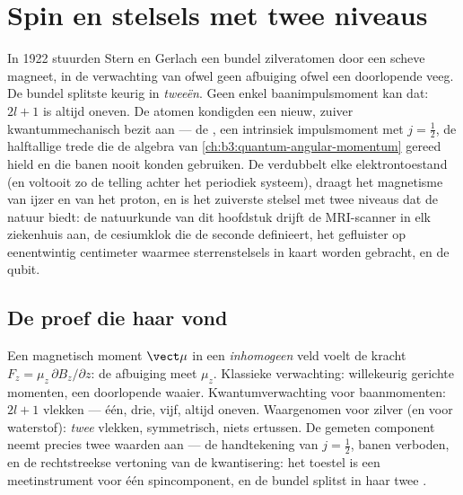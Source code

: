 \chapter{Spin en stelsels met twee niveaus}\label{ch:b3:spin-two-level}

In 1922 stuurden Stern en Gerlach een bundel zilveratomen door een
scheve magneet, in de verwachting van ofwel geen afbuiging ofwel een
doorlopende veeg. De bundel splitste keurig in \emph{tweeën}. Geen enkel
baanimpulsmoment kan dat: $2l + 1$ is altijd oneven. De atomen kondigden
een nieuw, zuiver kwantummechanisch bezit aan --- de \emph{}, een
intrinsiek impulsmoment met $j = \tfrac12$, de halftallige trede die de
algebra van \cref{ch:b3:quantum-angular-momentum} gereed hield en die
banen nooit konden gebruiken. De  verdubbelt elke elektrontoestand
(en voltooit zo de telling achter het periodiek systeem), draagt het
magnetisme van ijzer en van het proton, en is het zuiverste stelsel met
twee niveaus dat de natuur biedt: de natuurkunde van dit hoofdstuk drijft
de MRI-scanner in elk ziekenhuis aan, de cesiumklok die de seconde
definieert, het gefluister op eenentwintig centimeter waarmee
sterrenstelsels in kaart worden gebracht, en de qubit.

\section{De proef die haar vond}

\begin{example}\label{ex:b3:spin-two-level:stern-gerlach}
Een magnetisch moment $\vect\mu$ in een \emph{inhomogeen} veld voelt de
kracht $F_z = \mu_z\,\partial B_z/\partial z$: de afbuiging meet $\mu_z$.
Klassieke verwachting: willekeurig gerichte momenten, een doorlopende
waaier. Kwantumverwachting voor baanmomenten: $2l + 1$ vlekken --- één,
drie, vijf, altijd oneven. Waargenomen voor zilver (en voor waterstof):
\emph{twee} vlekken, symmetrisch, niets ertussen. De gemeten component
neemt precies twee waarden aan --- de handtekening van $j
= \tfrac12$,
banen verboden, en de rechtstreekse vertoning van de kwantisering: het
toestel is een meetinstrument voor één spincomponent, en de bundel
splitst in haar twee .
\end{example}

